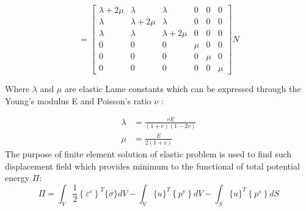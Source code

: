 \begin{equation}
    [E] = \left[ {\begin{array}{*{20}{c}}
        {\lambda  + 2\mu }&\lambda &\lambda &0&0&0\\
        \lambda &{\lambda  + 2\mu }&\lambda &0&0&0\\
        \lambda &\lambda &{\lambda  + 2\mu }&0&0&0\\
        0&0&0&\mu &0&0\\
        0&0&0&0&\mu &0\\
        0&0&0&0&0&\mu 
        \end{array}} \right] N
\end{equation}

Where $\lambda$ and $\mu$ are elastic Lame constants which can be expressed through the Young’s modulus E and Poisson’s ratio $\nu$ :

\begin{equation} 
    \label{eq1}
    \begin{split}
        \lambda  &= \frac{{vE}}{{(1 + v)(1 - 2v)}}\\
        \mu  &= \frac{E}{{2(1 + v)}}
    \end{split}
    \end{equation}
The purpose of finite element solution of elastic problem is used to find such displacement field which provides minimum to the functional of total potential energy $\Pi$:
    \begin{equation}
 \Pi=\int_{V} \frac{1}{2}\left\{\varepsilon^{e}\right\}^{T}\{\sigma\} d V-\int_{V}\{u\}^{T}\left\{p^{v}\right\} d V-\int_{S}\{u\}^{T}\left\{p^{s}\right\} d S 
\end{equation}

